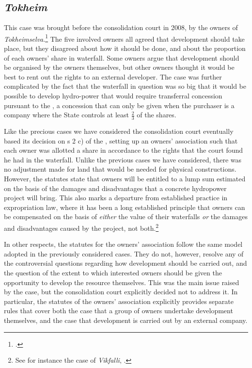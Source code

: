 \subsection{\emph{Tokheim}}

This case was brought before the consolidation court in 2008, by the owners of \emph{Tokheimselva}.\footcite{tokheim08} The five involved owners all agreed that development should take place, but they disagreed about how it should be done, and about the proportion of each owners' share in waterfall. Some owners argue that development should be organised by the owners themselves, but other owners thought it would be best to rent out the rights to an external developer. The case was further complicated by the fact that the waterfall in question was so big that it would be possible to develop hydro-power that would require transferral concession pursuant to the \cite{ica17}, a concession that can only be given when the purchaser is a company where the State controls at least $\frac{2}{3}$ of the shares. 

Like the precious cases we have considered the consolidation court eventually based its decision on s 2 c) of the \cite{lca79}, setting up an owners' association such that each owner was allotted a share in accordance to the rights that the court found he had in the waterfall. Unlike the previous cases we have considered, there was no adjustment made for land that would be needed for physical constructions. However, the statutes state that owners will be entitled to a lump sum estimated on the basis of the damages and disadvantages that a concrete hydropower project will bring. This also marks a departure from established practice in expropriation law, where it has been a long established principle that owners can be compensated on the basis of \emph{either} the value of their waterfalls \emph{or} the damages and disadvantages caused by the project, not both.\footnote{See for instance the case of \emph{Vikfalli}, \cite{vikfalli71}.} 

In other respects, the statutes for the owners' association follow the same model adopted in the previously considered cases. They do not, however, resolve any of the controversial questions regarding how development should be carried out, and the question of the extent to which interested owners should be given the opportunity to develop the resource themselves. This was the main issue raised by the case, but the consolidation court explicitly decided not to address it. In particular, the statutes of the owners' association explicitly provides separate rules that cover both the case that a group of owners undertake development themselves, and the case that development is carried out by an external company. 


